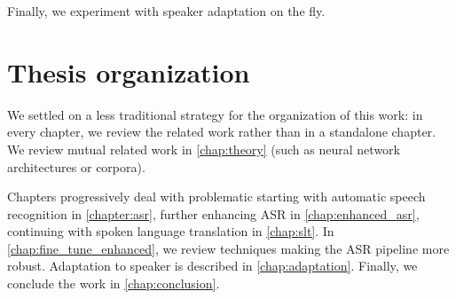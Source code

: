 Finally, we experiment with speaker adaptation on the fly. 

\section*{Thesis organization}
We settled on a less traditional strategy for the organization of this work: in every chapter, we review the related work rather than in a standalone chapter. We review mutual related work in \cref{chap:theory} (such as neural network architectures or corpora).

Chapters progressively deal with problematic starting with automatic speech recognition in \cref{chapter:asr}, further enhancing ASR in \cref{chap:enhanced_asr}, continuing with spoken language translation in \cref{chap:slt}. In \cref{chap:fine_tune_enhanced}, we review techniques making the ASR pipeline more robust. Adaptation to speaker is described in \cref{chap:adaptation}. Finally, we conclude the work in \cref{chap:conclusion}.
